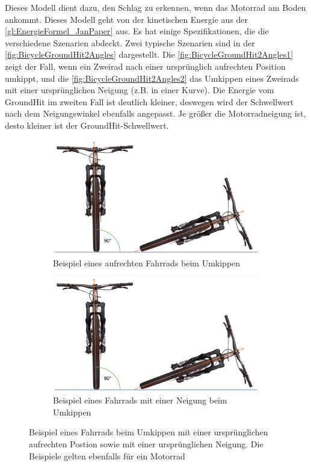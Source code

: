 Dieses Modell dient dazu, den Schlag zu erkennen, wenn das Motorrad am Boden ankommt. Dieses Modell geht von der kinetischen Energie aus der \autoref{gl:EnergieFormel_JanPaper} aus. Es hat einige Spezifikationen, die die verschiedene Szenarien abdeckt. Zwei typische Szenarien sind in der \autoref{fig:BicycleGroundHit2Angles} dargestellt. Die \autoref{fig:BicycleGroundHit2Angles1} zeigt der Fall, wenn ein Zweirad nach einer ursprünglich aufrechten Position umkippt, und die \autoref{fig:BicycleGroundHit2Angles2} das Umkippen eines Zweirads mit einer ursprünglichen Neigung (z.B. in einer Kurve).
Die Energie vom GroundHit im zweiten Fall ist deutlich kleiner, deswegen wird der Schwellwert nach dem Neigungswinkel ebenfalls angepasst. Je größer die Motorradneigung ist, desto kleiner ist der GroundHit-Schwellwert.\\

\begin{figure}[htpb]
	\centering
	\begin{subfigure}{0.49\textwidth}
		\centering
		\includegraphics[page = 1, width=\textwidth]{Bilder/BicycleGroundHit2Angles.pdf}
		\caption{Beispiel eines aufrechten Fahrrads beim Umkippen}
		\label{fig:BicycleGroundHit2Angles1}
	\end{subfigure}
	\begin{subfigure}{0.49\textwidth}
		\centering
		\includegraphics[page = 2, width=\textwidth]{Bilder/BicycleGroundHit2Angles.pdf}
		\caption{Beispiel eines Fahrrads mit einer Neigung beim Umkippen}
		\label{fig:BicycleGroundHit2Angles2}
	\end{subfigure}
	\caption{Beispiel eines Fahrrads beim Umkippen mit einer ursprünglichen aufrechten Postion sowie mit einer ursprünglichen Neigung. Die Beispiele gelten ebenfalls für ein Motorrad}
	\label{fig:BicycleGroundHit2Angles}
\end{figure}

